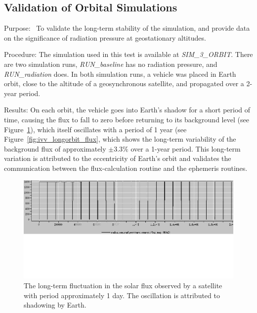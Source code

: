 \subsection{Validation of Orbital Simulations}
  \label{test:orbital_long}
  \begin{description}
  \item{Purpose:}\ \newline
    To validate the long-term stability of the simulation, and provide data on the significance of radiation pressure at geostationary altitudes.
  \item{Procedure:}\newline
     The simulation used in this test is available at \textit{SIM\_3\_ORBIT}.  There are two simulation runs, \textit{RUN\_baseline} has no radiation pressure, and \textit{RUN\_radiation} does.  In both simulation runs,
     a vehicle was placed in Earth orbit, close to the altitude of a
     geosynchronous satellite, and propagated over a 2-year period.
  \item{Results:}\newline
     On each orbit, the vehicle goes into Earth's shadow for a short
     period of time, causing the flux to fall to zero before returning to
     its background level (see Figure~\ref{fig:ivv_orbitfluxshort}), which itself oscillates with a period of 1 year (see
     Figure~\ref{fig:ivv_longorbit_flux}, which
     shows the long-term variability
     of the background flux of approximately $\pm 3.3\%$ over a 1-year
     period.  This long-term variation is attributed to the eccentricity of Earth's orbit
     and validates the communication between the flux-calculation
     routine and the ephemeris routines.

     \begin{figure}[!ht]
     \begin{center}
     \includegraphics[width=120mm]{figs/orbital/orbitfluxshort.jpg}
     \caption{The long-term fluctuation in the solar flux observed by a
      satellite with period approximately 1 day.  The oscillation is attributed to shadowing by Earth.}
     \label{fig:ivv_orbitfluxshort}
     \end{center}
     \end{figure}


\end{description}
